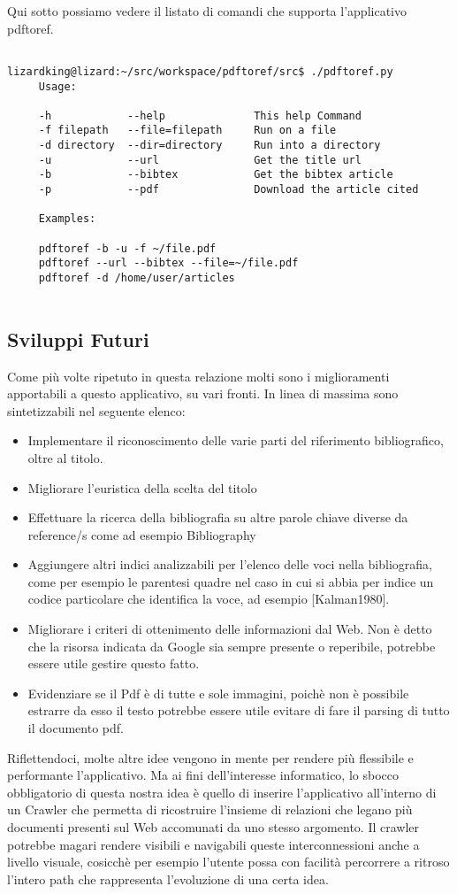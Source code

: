 Qui sotto possiamo vedere il listato di comandi che supporta l'applicativo pdftoref.
\begin{verbatim}

lizardking@lizard:~/src/workspace/pdftoref/src$ ./pdftoref.py
     Usage: 

     -h            --help              This help Command 
     -f filepath   --file=filepath     Run on a file 
     -d directory  --dir=directory     Run into a directory 
     -u            --url               Get the title url 
     -b            --bibtex            Get the bibtex article 
     -p            --pdf               Download the article cited
 
     Examples:

     pdftoref -b -u -f ~/file.pdf
     pdftoref --url --bibtex --file=~/file.pdf
     pdftoref -d /home/user/articles 


\end{verbatim}

\subsection{Sviluppi Futuri}\label{sviluppifuturi}
Come più volte ripetuto in questa relazione molti sono i miglioramenti apportabili a questo applicativo, su vari fronti. In linea di massima sono sintetizzabili nel seguente elenco:

\begin{itemize}
\item Implementare il riconoscimento delle varie parti del riferimento bibliografico, oltre al titolo. 
\item Migliorare l'euristica della scelta del titolo
\item Effettuare la ricerca della bibliografia su altre parole chiave diverse da reference/s come ad esempio Bibliography
\item Aggiungere altri indici analizzabili per l'elenco delle voci nella bibliografia, come per esempio le parentesi quadre nel caso in cui si abbia per indice un codice particolare che identifica la voce, ad esempio [Kalman1980].
\item Migliorare i criteri di ottenimento delle informazioni dal Web. Non è detto che la risorsa indicata da Google sia sempre presente o reperibile, potrebbe essere utile gestire questo fatto.
\item Evidenziare se il Pdf è di tutte e sole immagini, poichè non è possibile estrarre da esso il testo potrebbe essere utile evitare di fare il parsing di tutto il documento pdf.
\end{itemize}

Riflettendoci, molte altre idee vengono in mente per rendere più flessibile e performante l'applicativo. Ma ai fini dell'interesse informatico, lo sbocco obbligatorio di questa nostra idea è quello di inserire l'applicativo all'interno di un Crawler che permetta di ricostruire l'insieme di relazioni che legano più documenti presenti sul Web accomunati da uno stesso argomento. Il crawler potrebbe magari rendere visibili e navigabili queste interconnessioni anche a livello visuale, cosicchè per esempio l'utente possa con facilità percorrere a ritroso l'intero path che rappresenta l'evoluzione di una certa idea.
